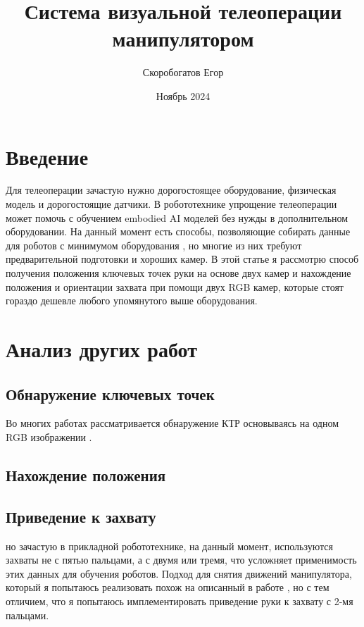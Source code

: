 \documentclass[12pt, a4paper]{article}
\title{Система визуальной телеоперации манипулятором}
\author{Скоробогатов Егор}
\date{Ноябрь 2024}
\begin{document}
\maketitle

\section{Введение}
    Для телеоперации зачастую нужно дорогостоящее оборудование, 
    физическая модель и дорогостоящие датчики. 
    В робототехнике упрощение телеоперации может помочь с обучением 
    embodied AI моделей без нужды в дополнительном оборудовании. 
    На данный момент есть способы, позволяющие собирать данные для роботов с минимумом оборудования \cite{umi},
    но многие из них требуют предварительной подготовки и хороших камер. 
    В этой статье я рассмотрю способ получения положения ключевых 
    точек руки на основе двух камер
    и нахождение положения и ориентации захвата при помощи двух RGB камер,
    которые стоят гораздо дешевле любого упомянутого выше оборудования.


\section{Анализ других работ}
    \subsection{Обнаружение ключевых точек}
        Во многих работах рассматривается обнаружение КТР основываясь 
        на одном RGB изображении \cite{interhand} 
        \cite{multiviewbootstrapping}.
        
    \subsection{Нахождение положения}
    \subsection{Приведение к захвату}
    но зачастую в прикладной робототехнике, на данный момент, используются 
    захваты не с пятью пальцами, а с двумя или тремя, 
    что усложняет применимость этих данных для обучения роботов. 
    Подход для снятия движений манипулятора, который я попытаюсь 
    реализовать похож на описанный в работе \cite{anyteleop},
    но с тем отличием, что я попытаюсь имплементировать приведение руки к 
    захвату с 2-мя пальцами. 

\section{}
\printbibliography[]
\end{document}
